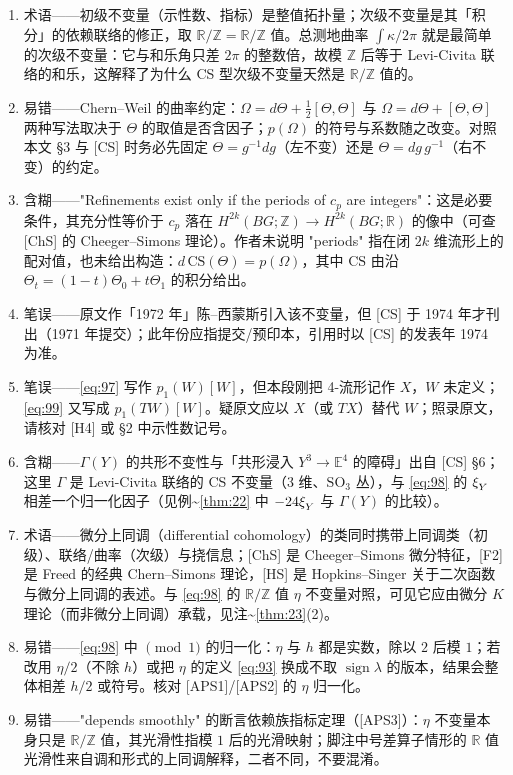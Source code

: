 \documentclass[11pt]{amsart}
\theoremstyle{definition}
\theoremstyle{remark}
\theoremstyle{plain}
\numberwithin{equation}{section}
\renewcommand{\:}{\colon}
\newcommand{\EE}{\mathbb E}
\newcommand{\RR}{{\mathbb R}}
\newcommand{\ZZ}{{\mathbb Z}}
\DeclareRobustCommand{\mstrut}{^{\vphantom{1*\prime y\vee M}}}
\DeclareMathOperator{\sign}{sign}
\newcommand{\RZ}{\RR/\ZZ}
\newcommand{\xia}[1]{\xi \mstrut _{#1}}
\begin{document}
\begin{enumerate}[leftmargin=2.2em,itemsep=2pt,topsep=2pt]
  \item 术语——初级不变量（示性数、指标）是整值拓扑量；次级不变量是其「积分」的依赖联络的修正，取 $\RZ=\RR/\ZZ$ 值。总测地曲率 $\int\kappa/2\pi$ 就是最简单的次级不变量：它与和乐角只差 $2\pi$ 的整数倍，故模 $\ZZ$ 后等于 Levi-Civita 联络的和乐，这解释了为什么 CS 型次级不变量天然是 $\RZ$ 值的。
  \item 易错——Chern–Weil 的曲率约定：$\Omega = d\Theta + \frac{1}{2}[\Theta,\Theta]$ 与 $\Omega = d\Theta + [\Theta,\Theta]$ 两种写法取决于 $\Theta$ 的取值是否含因子；$p(\Omega)$ 的符号与系数随之改变。对照本文 §3 与 [CS] 时务必先固定 $\Theta = g^{-1}dg$（左不变）还是 $\Theta = dg\,g^{-1}$（右不变）的约定。
  \item 含糊——"Refinements exist only if the periods of $c_p$ are integers"：这是必要条件，其充分性等价于 $c_p$ 落在 $H^{2k}(BG;\ZZ)\to H^{2k}(BG;\RR)$ 的像中（可查 [ChS] 的 Cheeger–Simons 理论）。作者未说明 "periods" 指在闭 $2k$ 维流形上的配对值，也未给出构造：$d\,\mathrm{CS}(\Theta) = p(\Omega)$，其中 $\mathrm{CS}$ 由沿 $\Theta_t=(1-t)\Theta_0+t\Theta_1$ 的积分给出。
  \item 笔误——原文作「1972 年」陈–西蒙斯引入该不变量，但 [CS] 于 1974 年才刊出（1971 年提交）；此年份应指提交/预印本，引用时以 [CS] 的发表年 1974 为准。
  \item 笔误——\eqref{eq:97} 写作 $p_1(W)[W]$，但本段刚把 4-流形记作 $X$，$W$ 未定义；\eqref{eq:99} 又写成 $p_1(TW)[W]$。疑原文应以 $X$（或 $TX$）替代 $W$；照录原文，请核对 [H4] 或 §2 中示性数记号。
  \item 含糊——$\Gamma (Y)$ 的共形不变性与「共形浸入 $Y^3\to\EE^4$ 的障碍」出自 [CS] §6；这里 $\Gamma$ 是 Levi-Civita 联络的 CS 不变量（3 维、$\mathrm{SO}_3$ 丛），与 \eqref{eq:98} 的 $\xia Y$ 相差一个归一化因子（见例\textasciitilde{}\ref{thm:22} 中 $-24\xia Y$ 与 $\Gamma(Y)$ 的比较）。
  \item 术语——微分上同调（differential cohomology）的类同时携带上同调类（初级）、联络/曲率（次级）与挠信息；[ChS] 是 Cheeger–Simons 微分特征，[F2] 是 Freed 的经典 Chern–Simons 理论，[HS] 是 Hopkins–Singer 关于二次函数与微分上同调的表述。与 \eqref{eq:98} 的 $\RZ$ 值 $\eta$ 不变量对照，可见它应由微分 $K$ 理论（而非微分上同调）承载，见注\textasciitilde{}\ref{thm:23}(2)。
  \item 易错——\eqref{eq:98} 中 $\pmod1$ 的归一化：$\eta$ 与 $h$ 都是实数，除以 $2$ 后模 $1$；若改用 $\eta/2$（不除 $h$）或把 $\eta$ 的定义 \eqref{eq:93} 换成不取 $\sign\lambda$ 的版本，结果会整体相差 $h/2$ 或符号。核对 [APS1]/[APS2] 的 $\eta$ 归一化。
  \item 易错——"depends smoothly" 的断言依赖族指标定理（[APS3]）：$\eta$ 不变量本身只是 $\RR/\ZZ$ 值，其光滑性指模 $1$ 后的光滑映射；脚注中号差算子情形的 $\RR$ 值光滑性来自调和形式的上同调解释，二者不同，不要混淆。

\end{enumerate}
\end{document}
